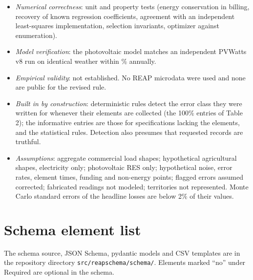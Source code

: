 \documentclass[10pt]{article}
\begin{document}
\begin{itemize}
\item \emph{Numerical correctness}: unit and property tests (energy conservation in
billing, recovery of known regression coefficients, agreement with an independent
least-squares implementation, selection invariants, optimizer against enumeration).
\item \emph{Model verification}: the photovoltaic model matches an independent PVWatts v8
run on identical weather within \PvRefAnnualDiff\% annually.
\item \emph{Empirical validity}: not established. No REAP microdata were used and none
are public for the revised rule.
\item \emph{Built in by construction}: deterministic rules detect the error class they
were written for whenever their elements are collected (the 100\% entries of Table 2);
the informative entries are those for specifications lacking the elements, and the
statistical rules. Detection also presumes that requested records are truthful.
\item \emph{Assumptions}: aggregate commercial load shapes; hypothetical agricultural
shapes, electricity only; photovoltaic RES only; hypothetical noise, error rates, element
times, funding and non-energy points; flagged errors assumed corrected; fabricated
readings not modeled; territories not represented. Monte Carlo standard errors of the
headline losses are below 2\% of their values.
\end{itemize}

\section{Schema element list}

The schema source, JSON Schema, pydantic models and CSV templates are in the repository
directory \nolinkurl{src/reapschema/schema/}. Elements marked ``no'' under Required are
optional in the schema.

{\footnotesize

}



\end{document}
